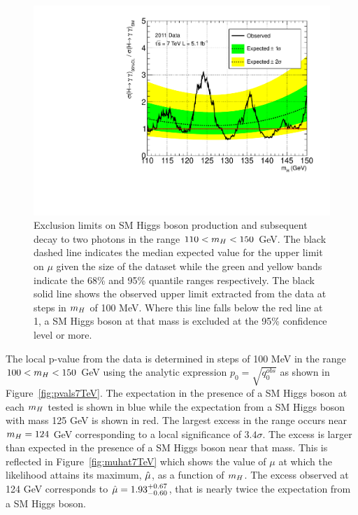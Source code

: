 \begin{figure}
\begin{center}
  \includegraphics[width=.8\textwidth]{hgg7TeV/statsPlots/limit-100MeV.pdf}
\end{center}
 \caption{Exclusion limits on SM Higgs boson production and subsequent decay to two photons in the range
 $110 < m_{H} < 150$ GeV. The black dashed line indicates the median expected value for the upper limit on $\mu$
 given the size of the dataset while the green and yellow bands indicate the 68\% and 95\% quantile ranges 
 respectively.
 The black solid line shows the observed upper limit extracted from the data at steps in $m_{H}$ of 100 MeV. 
 Where this line falls below the red line at 1, a SM Higgs boson at that mass is excluded at the 95\% confidence level or more.}
\label{fig:limits7TeV}
\end{figure}

The local p-value from the data is determined in steps of 100 MeV in the range $100 < m_{H} < 150 $ GeV
using the analytic expression $p_{0} = \sqrt{q_{0}^{obs}}$
as shown in Figure~\ref{fig:pvals7TeV}. The expectation in the presence of a SM Higgs boson at each $m_{H}$ tested
is shown in blue while the expectation from a SM Higgs boson with mass 125 GeV is shown in red. 
The largest excess in the range occurs near $m_{H}=124$ GeV corresponding
to a local significance of $3.4\sigma$. The excess is larger than expected in the presence of a SM 
Higgs boson near that mass. This is reflected in Figure~\ref{fig:muhat7TeV} which shows the value of 
$\mu$ at which the likelihood attains its maximum, $\hat{\mu}$, as a function of $m_{H}$. 
The excess observed at 124 GeV corresponds to $\hat{\mu}=1.93^{+0.67}_{-0.60}$, that is nearly twice 
the expectation from a SM Higgs boson.

